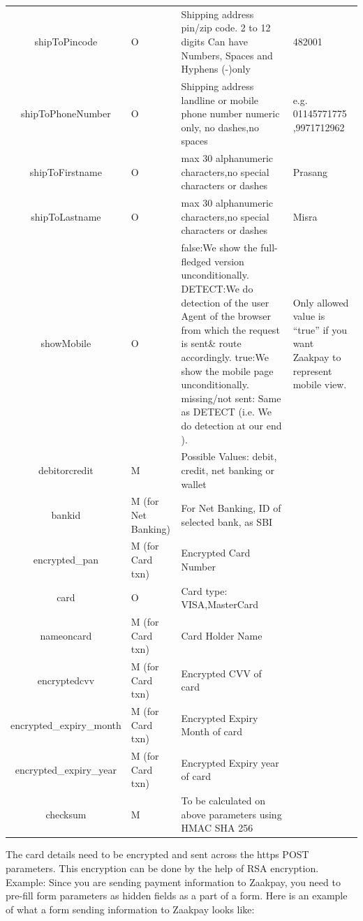\documentclass{article}
\begin{document}
\begin{longtable}{||c| p{2.09cm}|| p{5.5cm}| p{4.7cm}||}
shipToPincode & O & Shipping address pin/zip code. 2 to 12 digits Can have Numbers, Spaces and Hyphens (-)only & 482001\\
shipToPhoneNumber & O & Shipping address landline or mobile phone number numeric only, no dashes,no spaces & e.g. 01145771775 ,9971712962\\
shipToFirstname & O & max 30 alphanumeric characters,no  special characters or dashes & Prasang\\
shipToLastname & O & max 30 alphanumeric characters,no  special characters or dashes & Misra\\
showMobile & O & false:We show the full-fledged version unconditionally. DETECT:We do detection of the user Agent of the browser from which the request is sent\& route accordingly. true:We show the mobile page unconditionally. missing/not sent: Same as DETECT (i.e. We do detection at our end ). & Only allowed value is “true” if you want Zaakpay to represent mobile view.\\
debitorcredit & M & Possible Values: debit, credit, net banking or wallet & \\
bankid & M (for Net Banking) & For Net Banking, ID of selected bank, as SBI & \\
encrypted\_pan & M (for Card txn) & Encrypted Card Number &  \\
card & O &Card type: VISA,MasterCard & \\
nameoncard & M (for Card txn) & Card Holder Name & \\
encryptedcvv & M (for Card txn) & Encrypted CVV of card & \\
encrypted\_expiry\_month & M (for Card txn) & Encrypted Expiry Month of card & \\
encrypted\_expiry\_year & M (for Card txn) & Encrypted Expiry year of card & \\
checksum & M & To be calculated on above parameters using HMAC SHA 256 & \\
\end{longtable}

The card details need to be encrypted and sent across the https POST parameters. This encryption can be done by the help of RSA encryption.
Example:
Since you are sending payment information to Zaakpay, you need to pre-fill form parameters as hidden
fields as a part of a form. Here is an example of what a form sending information to Zaakpay looks
like:
\end{document}
